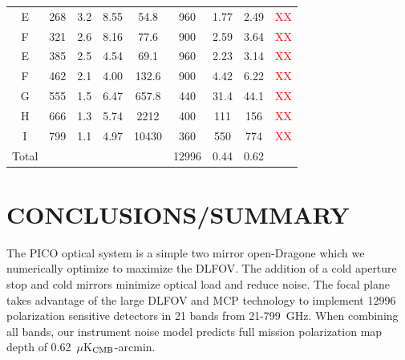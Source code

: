 \documentclass[]{spie}  %
\newcommand{\comr}[1]{\textcolor{red}{#1}}
\begin{document}
\begin{table}[ht]
\begin{tabular}{|c|c|c|c|c|c|c|cc|}
E     & 268 & 3.2  & 8.55  & 54.8    & 960   & 1.77   & 2.49 & \comr{XX}   \\
F     & 321 & 2.6  & 8.16  & 77.6    & 900   & 2.59   & 3.64 & \comr{XX}   \\
E     & 385 & 2.5  & 4.54  & 69.1    & 960   & 2.23   & 3.14 & \comr{XX}   \\
F     & 462 & 2.1  & 4.00  & 132.6   & 900   & 4.42   & 6.22 & \comr{XX}   \\
G     & 555 & 1.5  & 6.47  & 657.8   & 440   & 31.4   & 44.1 & \comr{XX}  \\
H     & 666 & 1.3  & 5.74  & 2212    & 400   & 111    & 156  & \comr{XX} \\
I     & 799 & 1.1  & 4.97  & 10430   & 360   & 550    & 774  & \comr{XX} \\ 
\hline
Total &     &      &       &         & 12996 & 0.44   & 0.62 &   \\
\hline
\end{tabular}
\end{table}


\section{CONCLUSIONS/SUMMARY}

The PICO optical system is a simple two mirror open-Dragone which we numerically optimize to maximize the DLFOV.  The addition of a 
cold aperture stop and cold mirrors minimize optical load and reduce noise.  The focal plane takes advantage of the large DLFOV and MCP 
technology to implement 12996 polarization sensitive detectors in 21 bands from 21-799~GHz.  When combining all bands, our instrument 
noise model predicts full mission polarization map depth of 0.62~$\mu$K$_{\rm CMB}$-arcmin.




\end{document}
